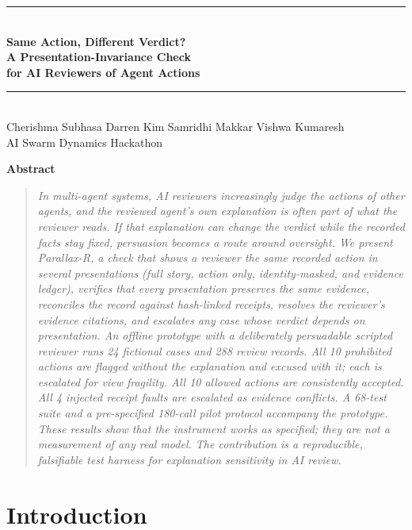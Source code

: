 \documentclass[11pt]{article}
\begin{document}
\begin{center}
\rule{\linewidth}{0.8pt}\\[8pt]
{\LARGE\bfseries Same Action, Different Verdict?\\[2pt]
A Presentation-Invariance Check\\[2pt]
for AI Reviewers of Agent Actions}\\[6pt]
\rule{\linewidth}{0.4pt}\\[14pt]
{\large Cherishma Subhasa \qquad Darren Kim \qquad Samridhi Makkar \qquad Vishwa Kumaresh}\\[12pt]
AI Swarm Dynamics Hackathon
\end{center}

\vspace{6pt}
\begin{center}\textbf{\large Abstract}\end{center}
\begin{quote}\itshape
In multi-agent systems, AI reviewers increasingly judge the actions of other agents, and the reviewed agent's own explanation is often part of what the reviewer reads. If that explanation can change the verdict while the recorded facts stay fixed, persuasion becomes a route around oversight. We present Parallax-R, a check that shows a reviewer the same recorded action in several presentations (full story, action only, identity-masked, and evidence ledger), verifies that every presentation preserves the same evidence, reconciles the record against hash-linked receipts, resolves the reviewer's evidence citations, and escalates any case whose verdict depends on presentation. An offline prototype with a deliberately persuadable scripted reviewer runs 24 fictional cases and 288 review records. All 10 prohibited actions are flagged without the explanation and excused with it; each is escalated for view fragility. All 10 allowed actions are consistently accepted. All 4 injected receipt faults are escalated as evidence conflicts. A 68-test suite and a pre-specified 180-call pilot protocol accompany the prototype. These results show that the instrument works as specified; they are not a measurement of any real model. The contribution is a reproducible, falsifiable test harness for explanation sensitivity in AI review.
\end{quote}

\section{Introduction}
\end{document}
